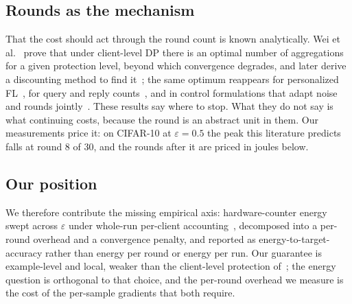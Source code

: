 \subsection{Rounds as the mechanism}

That the cost should act through the round count is known analytically. Wei
et al.~\cite{wei2020federated} prove that under client-level DP there is an optimal
number of aggregations for a given protection level, beyond which
convergence degrades, and later derive a discounting method to find
it~\cite{wei2021user}; the same optimum reappears for personalized
FL~\cite{wei2023personalized}, for query and reply counts~\cite{zhou2023optimizing}, and in control
formulations that adapt noise and rounds jointly~\cite{yuan2025optimal}. These results
say where to stop. What they do not say is what continuing costs, because
the round is an abstract unit in them. Our measurements price it: on CIFAR-10 at $\varepsilon = 0.5$ the peak this
literature predicts falls at round 8 of 30, and the rounds after it are
priced in joules below.

\subsection{Our position}

We therefore contribute the missing empirical axis: hardware-counter energy
swept across $\varepsilon$ under whole-run per-client
accounting~\cite{abadi2016deep}, decomposed into a per-round overhead and a
convergence penalty, and reported as energy-to-target-accuracy rather than
energy per round or energy per run. Our guarantee is example-level and local,
weaker than the client-level protection of~\cite{geyer2017differentially,
wei2020federated}; the energy question is orthogonal to that choice, and the
per-round overhead we measure is the cost of the per-sample gradients that
both require.